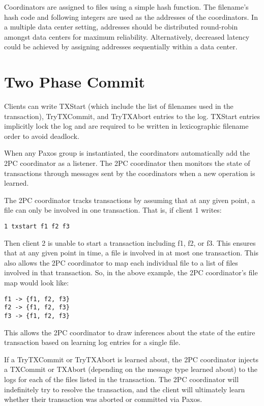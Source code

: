 \documentclass[11pt]{article}
\begin{document}
Coordinators are assigned to files using a simple hash function.
The filename's hash code and following integers are used as the addresses of the coordinators.
In a multiple data center setting, addresses should be distributed round-robin amongst data centers for maximum reliability.
Alternatively, decreased latency could be achieved by assigning addresses sequentially within a data center.

\section{Two Phase Commit}

Clients can write TXStart (which include the list of filenames used in the transaction), TryTXCommit, and TryTXAbort entries to the log.
TXStart entries implicitly lock the log and are required to be written in lexicographic filename order to avoid deadlock.

When any Paxos group is instantiated, the coordinators automatically add the 2PC coordinator as a listener.
The 2PC coordinator then monitors the state of transactions through messages sent by the coordinators when a new operation is learned.

The 2PC coordinator tracks transactions by assuming that at any given point, a file can only be involved in one transaction.
That is, if client 1 writes:
\begin{verbatim}
1 txstart f1 f2 f3
\end{verbatim}

Then client 2 is unable to start a transaction including f1, f2, or f3.
This ensures that at any given point in time, a file is involved in at most one transaction.
This also allows the 2PC coordinator to map each individual file to a list of files involved in that transaction.
So, in the above example, the 2PC coordinator's file map would look like:

\begin{verbatim}
f1 -> {f1, f2, f3}
f2 -> {f1, f2, f3}
f3 -> {f1, f2, f3}
\end{verbatim}

This allows the 2PC coordinator to draw inferences about the state of the entire transaction based on learning log entries for a single file.

If a TryTXCommit or TryTXAbort is learned about, the 2PC coordinator injects a TXCommit or TXAbort (depending on the message type learned about) to the logs for each of the files listed in the transaction.
The 2PC coordinator will indefinitely try to resolve the transaction, and the client will ultimately learn whether their transaction was aborted or committed via Paxos. 
\end{document}
